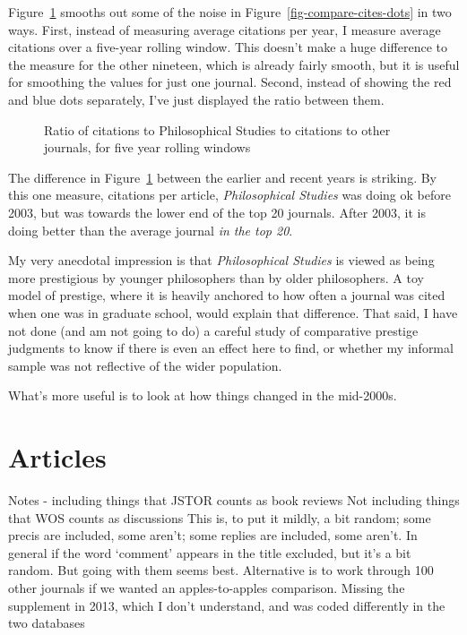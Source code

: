 \documentclass[
  10pt,
  letterpaper,
  DIV=11,
  numbers=noendperiod,
  twoside]{scrartcl}
\begin{document}
Figure~\ref{fig-compare-cites-rolling} smooths out some of the noise in
Figure~\ref{fig-compare-cites-dots} in two ways. First, instead of
measuring average citations per year, I measure average citations over a
five-year rolling window. This doesn't make a huge difference to the
measure for the other nineteen, which is already fairly smooth, but it
is useful for smoothing the values for just one journal. Second, instead
of showing the red and blue dots separately, I've just displayed the
ratio between them.

\begin{figure}


\caption{\label{fig-compare-cites-rolling}Ratio of citations to
Philosophical Studies to citations to other journals, for five year
rolling windows}

\end{figure}%

The difference in Figure~\ref{fig-compare-cites-rolling} between the
earlier and recent years is striking. By this one measure, citations per
article, \emph{Philosophical Studies} was doing ok before 2003, but was
towards the lower end of the top 20 journals. After 2003, it is doing
better than the average journal \emph{in the top 20}.

My very anecdotal impression is that \emph{Philosophical Studies} is
viewed as being more prestigious by younger philosophers than by older
philosophers. A toy model of prestige, where it is heavily anchored to
how often a journal was cited when one was in graduate school, would
explain that difference. That said, I have not done (and am not going to
do) a careful study of comparative prestige judgments to know if there
is even an effect here to find, or whether my informal sample was not
reflective of the wider population.

What's more useful is to look at how things changed in the mid-2000s.

\section{Articles}\label{articles}

Notes - including things that JSTOR counts as book reviews Not including
things that WOS counts as discussions This is, to put it mildly, a bit
random; some precis are included, some aren't; some replies are
included, some aren't. In general if the word `comment' appears in the
title excluded, but it's a bit random. But going with them seems best.
Alternative is to work through 100 other journals if we wanted an
apples-to-apples comparison. Missing the supplement in 2013, which I
don't understand, and was coded differently in the two databases
\end{document}
